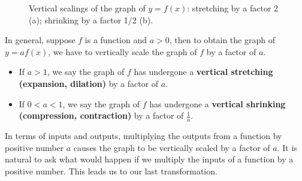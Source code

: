 \begin{figure}
\centering
\centerline{
\hspace{0.1cm}
}
\caption{Vertical scalings of the graph of $y=f(x)$: stretching by a factor 2 (a);  shrinking by a factor 1/2 (b). }
\end{figure}

In general, suppose $f$ is a function and $a>0$, then to obtain the graph of $y=a f(x)$, we have to vertically scale the graph of $f$  by a factor of $a$. 

\begin{itemize}

\item If $a > 1$, we say the graph of $f$ has undergone a \textbf{vertical stretching (expansion, dilation)} by a factor of $a$. 

\item If $0 < a < 1$, we say the graph of $f$ has undergone a \textbf{vertical shrinking (compression, contraction)} by a factor of $\frac{1}{a}$.
\end{itemize}

In terms of inputs and outputs,  multiplying the outputs from a function by positive number $a$ causes the graph to be vertically scaled by a factor of $a$.  It is natural to ask what would happen if we multiply the inputs of a function by a positive number.  This leads us to our last transformation.


